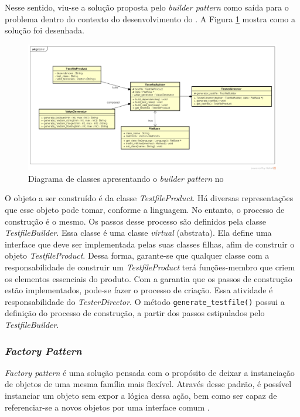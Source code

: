Nesse sentido, viu-se a solução proposta pelo \textit{builder pattern}
como saída para o problema dentro do contexto do desenvolvimento do
\Scarefault. A Figura \ref{testfile-diagram} mostra como a solução
foi desenhada.

\begin{figure}[h]
  \centering
    \includegraphics[width=\textwidth]{figuras/testfile-diagram.png}
    \caption{Diagrama de classes apresentando o \textit{builder pattern} no \framework}
    \label{testfile-diagram}
\end{figure}
\FloatBarrier

O objeto a ser construído é da classe \textit{TestfileProduct}. Há
diversas representações que esse objeto pode tomar, conforme a linguagem.
No entanto, o processo de construção é o mesmo. Os passos desse processo são definidos
pela classe \textit{TestfileBuilder}. Essa classe é uma classe
\textit{virtual} (abstrata). Ela define uma interface que deve ser
implementada pelas suas classes filhas, afim de construir o objeto
\textit{TestfileProduct}. Dessa forma, garante-se que qualquer
classe com a responsabilidade de construir um \textit{TestfileProduct}
terá funções-membro que criem os elementos essenciais do produto. Com a garantia
que os passos de construção estão implementados, pode-se fazer o processo de
criação. Essa atividade é responsabilidade do \textit{TesterDirector}. O
método \lstinline|generate_testfile()| possui a definição do processo de
construção, a partir dos passos estipulados pelo \textit{TestfileBuilder}.

\subsubsection{\textit{Factory Pattern}} \label{subsec-factory-pattern}
\textit{Factory pattern} é uma solução pensada com o propósito de deixar a
instanciação de objetos de uma mesma família mais flexível. Através desse
padrão,  é possível instanciar um objeto sem expor a lógica dessa ação, bem
como ser capaz de referenciar-se a novos objetos por uma interface comum
\cite{gammaEtAl1994}.

